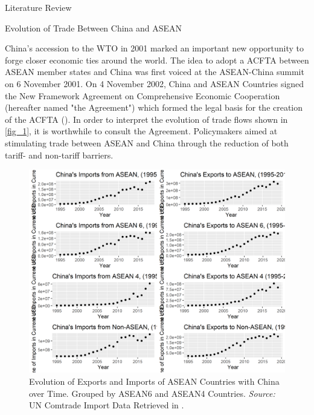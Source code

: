 \begin{section}{Literature Review}

\begin{subsection}{Evolution of Trade Between China and ASEAN}

China’s accession to the WTO in 2001 marked an important new opportunity to forge closer economic ties around the world. The idea to adopt a ACFTA between ASEAN member states and China was first voiced at the ASEAN-China summit on 6 November 2001. On 4 November 2002, China and ASEAN Countries signed the New Framework Agreement on Comprehensive Economic Cooperation (hereafter named "the Agreement") which formed the legal basis for the creation of the ACFTA (\cite{asean_2002_1}). In order to interpret the evolution of trade flows shown in \autoref{fig_1}, it is worthwhile to consult the Agreement. Policymakers aimed at stimulating trade between ASEAN and China through the reduction of both tariff- and non-tariff barriers.

\begin{figure}[H]
	\centering
	\includegraphics[width=\textwidth]{figure_1.png}
	\caption{\small{Evolution of Exports and Imports of ASEAN Countries with China over Time. Grouped by ASEAN6 and ASEAN4 Countries. \textit{Source:} UN Comtrade Import Data Retrieved in \cite{cepii-data_2022}.}}
	\label{fig_1}
\end{figure}


\end{subsection}
\end{section}
